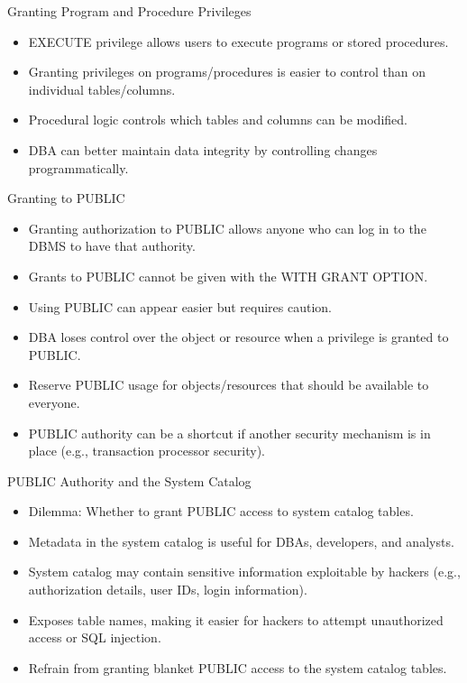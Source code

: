 \documentclass[aspectratio=169]{beamer}
\begin{document}
\begin{frame}{Granting Program and Procedure Privileges}
    \begin{itemize}
        \item EXECUTE privilege allows users to execute programs or stored procedures.
        \item Granting privileges on programs/procedures is easier to control than on individual tables/columns.
        \item Procedural logic controls which tables and columns can be modified.
        \item DBA can better maintain data integrity by controlling changes programmatically.
    \end{itemize}
\end{frame}

\begin{frame}{Granting to PUBLIC}
    \begin{itemize}
        \item Granting authorization to PUBLIC allows anyone who can log in to the DBMS to have that authority.
        \item Grants to PUBLIC cannot be given with the WITH GRANT OPTION.
        \item Using PUBLIC can appear easier but requires caution.
        \item DBA loses control over the object or resource when a privilege is granted to PUBLIC.
        \item Reserve PUBLIC usage for objects/resources that should be available to everyone.
        \item PUBLIC authority can be a shortcut if another security mechanism is in place (e.g., transaction processor security).
    \end{itemize}
\end{frame}

\begin{frame}{PUBLIC Authority and the System Catalog}
    \begin{itemize}
        \item Dilemma: Whether to grant PUBLIC access to system catalog tables.
        \item Metadata in the system catalog is useful for DBAs, developers, and analysts.
        \item System catalog may contain sensitive information exploitable by hackers (e.g., authorization details, user IDs, login information).
        \item Exposes table names, making it easier for hackers to attempt unauthorized access or SQL injection.
        \item Refrain from granting blanket PUBLIC access to the system catalog tables.
    \end{itemize}
\end{frame}
\end{document}

